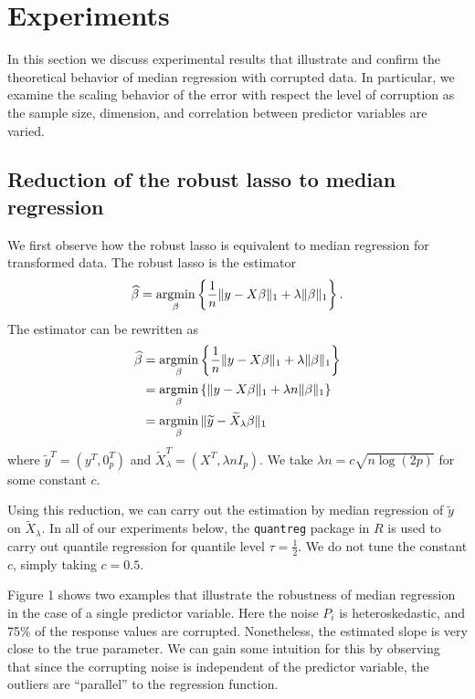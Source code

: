 
\section{Experiments}
\label{sec:experiments}

In this section we discuss experimental results that illustrate and confirm the theoretical behavior of
median regression with corrupted data. In particular, we examine the scaling behavior of the error
with respect the level of corruption as the sample size, dimension, and correlation between predictor variables
are varied.



\subsection{Reduction of the robust lasso to median regression}

We first observe how the robust lasso is equivalent to median regression for transformed data. The robust lasso is the  estimator
\begin{align*}
  \hat\beta = \argmin_\beta \left\{ \frac{1}{n}\|y - X\beta\|_1 + \lambda \|\beta\|_1\right\}.
\end{align*}
The estimator can be rewritten as
\begin{align*}
  \hat\beta &= \argmin_\beta \left\{ \frac{1}{n}\|y - X\beta\|_1 + \lambda \|\beta\|_1 \right\} \\
  &= \argmin_\beta \left\{ \|y - X\beta\|_1 + \lambda n \|\beta\|_1 \right\} \\
  &= \argmin_\beta \|\tilde y - \tilde X_\lambda \beta\|_1
\end{align*}
where $\tilde y^T = (y^T, 0_p^T)$  and $\tilde X_\lambda^T = (X^T, \lambda n I_p)$.
We take $\lambda n = c\sqrt{n \log (2p)}$ for some constant $c$.

Using this reduction, we can carry out the estimation by
median regression of $\tilde y$ on $\tilde X_\lambda$. In all of our experiments below, the \texttt{quantreg} package in $R$ is used to carry out quantile regression for quantile level $\tau = \frac{1}{2}$. We do not tune the constant $c$, simply taking $c=0.5$.

Figure 1 shows two examples that illustrate the robustness of median regression
in the case of a single predictor variable. Here the noise $P_i$ is heteroskedastic, and 75\% of the response values are corrupted. Nonetheless, the estimated slope is very close to the true parameter. We can gain some intuition for this by observing that since the corrupting noise is independent of the predictor variable, the outliers are ``parallel'' to the regression function. 

